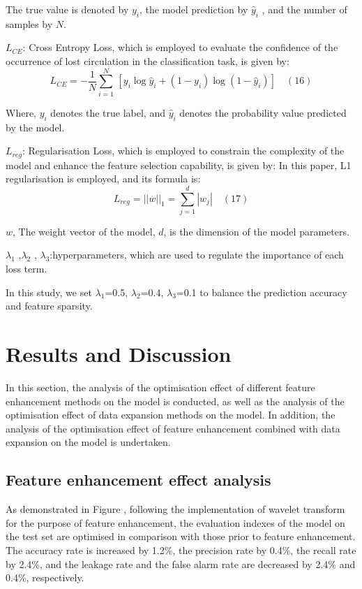 \documentclass[journal,article,submit,pdftex,moreauthors]{Definitions/mdpi}
\begin{document}
The true value is denoted by \({ y } _ { i } \), the model prediction by \(\widehat { y } _ { i }\) , and the number of samples by \(N\).


\(L _ { CE}\): Cross Entropy Loss, which is employed to evaluate the confidence of the occurrence of lost circulation in the classification task, is given by:
\[{{L}_{CE}}=-\frac{1}{N}\underset{i=1}{\overset{N}{\mathop \sum }}\,\left[ {{y}_{i}}\log {{{\hat{y}}}_{i}}+(1-{{y}_{i}})\log (1-{{{\hat{y}}}_{i}}) \right]\quad (16)\]

Where, \({y}_{i}\) denotes the true label, and \({\hat{y}}_{i}\) denotes the probability value predicted by the model.

\({L}_{reg
}\): Regularisation Loss, which is employed to constrain the complexity of the model and enhance the feature selection capability, is given by: In this paper, L1 regularisation is employed, and its formula is:
$$ L _ { r e g } = | | w | | _ { 1 } = \sum _ { j = 1 } ^ { d } | w _ { j } |\quad (17)$$

\(w\), The weight vector of the model, \(d\), is the dimension of the model parameters.

\({{\lambda }_{1}}\) ,\({{\lambda }_{2}}\) , \({{\lambda }_{3}}\):hyperparameters, which are used to regulate the importance of each loss term. 

In this study, we set \({{\lambda }_{1}}\)=0.5, \({{\lambda }_{2}}\)=0.4, \({{\lambda }_{3}}\)=0.1 to balance the prediction accuracy and feature sparsity.

\section{Results and Discussion}

In this section, the analysis of the optimisation effect of different feature enhancement methods on the model is conducted, as well as the analysis of the optimisation effect of data expansion methods on the model. In addition, the analysis of the optimisation effect of feature enhancement combined with data expansion on the model is undertaken.

\subsection{Feature enhancement effect analysis}

As demonstrated in Figure \label{fig:Evaluation of feature enhancement effects}, following the implementation of wavelet transform for the purpose of feature enhancement, the evaluation indexes of the model on the test set are optimised in comparison with those prior to feature enhancement. The accuracy rate is increased by 1.2\%, the precision rate by 0.4\%, the recall rate by 2.4\%, and the leakage rate and the false alarm rate are decreased by 2.4\% and 0.4\%, respectively.
\end{document}
